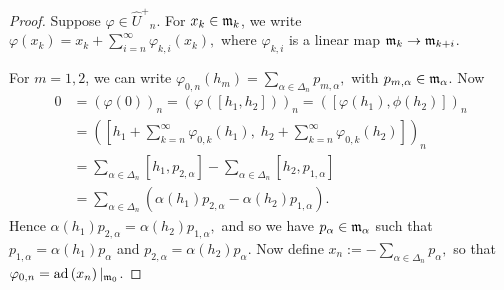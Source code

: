 \documentclass[11pt,letterpaper]{amsart}
\numberwithin{thecounter}{section}
\theoremstyle{definition}
\DeclareMathOperator{\ad}{ad}
\renewcommand{\a}{\alpha}
\newcommand{\Uhp}{{\widehat{U}^+}}
\begin{document}
\begin{shortver}
\begin{proof}
Suppose $\varphi\in\Uhp_n$. For $x_k\in {\frak m}_k$, we write
$\varphi\left(x_k \right) = x_k + \sum_{i=n}^\infty \varphi_{k,i}\left(x_k \right),$
where $ \varphi_{k,i}$ is a linear map ${\frak m}_{k}\to{\frak m}_{k+i}$.

For $m=1,2$, we can write
$ \varphi_{0,n}\left(h_m \right)= \sum_{\a\in\Delta_n} p_{m,\a},$ with $p_{m,\a}\in{\frak m}_\a$.
Now
\begin{align*}
0&=\left(\varphi(0)\right)_n= \left(\varphi\left(\left[h_1,h_2 \right] \right)\right)_n 
  = \left(\left[\varphi\left(h_1 \right),\phi\left(h_2 \right)\right]\right)_n\\
&= \left(\left[ h_1 + \sum_{k=n}^\infty \varphi_{0,k}\left(h_1 \right),\; h_2+ \sum_{k=n}^\infty \varphi_{0,k}\left(h_2 \right)\right]\right)_n\\
&=
\sum_{\a\in\Delta_n} \left[h_1,p_{2,\a} \right] -
\sum_{\a\in\Delta_n} \left[h_2,p_{1,\a} \right]\\
 &=
\sum_{\a\in\Delta_n}  \left(\a\left(h_1 \right)p_{2,\a}- \a\left(h_2 \right)p_{1,\a}\right).
\end{align*}
Hence
$\a(h_1) p_{2,\a}=\a(h_2) p_{1,\a},$
and so we have $p_{\a}\in\frak m_\a$ such that
$p_{1,\a}=\a\left(h_1\right)p_{\a}$ and $ p_{2,\a}=\a\left(h_2\right)p_{\a}$.
Now define 
$ x_n := -\sum_{\a\in\Delta_n} p_\a,$
so that 
$ \varphi_{0,n}=\ad\left(x_n\right)|_{{\frak m}_0}$.


\end{proof}
\end{shortver}
\end{document}
